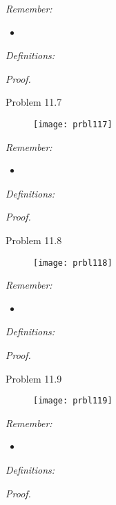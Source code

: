 \textit{Remember:}
\begin{itemize}
	\item 
\end{itemize}

\textit{Definitions:}


\textit{Proof.}

\clearpage


\Large{Problem 11.7}
\begin{figure}[H]
    \centering
    \texttt{[image: prbl117]}
    \label{fig:prbl117}
\end{figure}

\textit{Remember:}
\begin{itemize}
	\item 
\end{itemize}

\textit{Definitions:}


\textit{Proof.}

\clearpage


\Large{Problem 11.8}
\begin{figure}[H]
    \centering
    \texttt{[image: prbl118]}
    \label{fig:prbl118}
\end{figure}

\textit{Remember:}
\begin{itemize}
	\item 
\end{itemize}

\textit{Definitions:}


\textit{Proof.}

\clearpage



\Large{Problem 11.9}
\begin{figure}[H]
    \centering
    \texttt{[image: prbl119]}
    \label{fig:prbl119}
\end{figure}

\textit{Remember:}
\begin{itemize}
	\item 
\end{itemize}

\textit{Definitions:}


\textit{Proof.}

\clearpage


